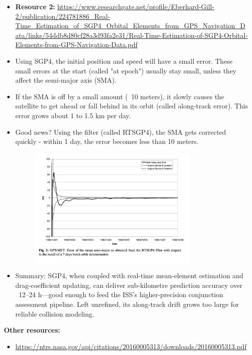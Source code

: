 \documentclass[12pt]{report}
\begin{document}
\begin{itemize}
  \item \textbf{Resource 2:} \url{https://www.researchgate.net/profile/Eberhard-Gill-2/publication/224781886_Real-Time_Estimation_of_SGP4_Orbital_Elements_from_GPS_Navigation_Data/links/54ddb8d80cf28a3d93fa2e31/Real-Time-Estimation-of-SGP4-Orbital-Elements-from-GPS-Navigation-Data.pdf}
        \item Using SGP4, the initial position and speed will have a small error. These small errors at the start (called "at epoch") usually stay small, unless they affect the semi-major axis (SMA).
        \item If the SMA is off by a small amount (~10 meters), it slowly causes the satellite to get ahead or fall behind in its orbit (called along-track error). This error grows about 1 to 1.5 km per day.
        \item Good news? Using the filter (called RTSGP4), the SMA gets corrected quickly - within 1 day, the error becomes less than 10 meters.
        \begin{figure}[H]
          \centering
          \includegraphics[width=0.8\textwidth]{figure_week_4_SGP4-RTSGP4.png}
          \label{fig:SPG4_error_RTSGP4}
        \end{figure}
        \item Summary: SGP4, when coupled with real-time mean-element estimation and drag-coefficient updating, can deliver sub-kilometre prediction accuracy over ~12–24 h—good enough to feed the ISS’s higher-precision conjunction assessment pipeline. Left unrefined, its along-track drift grows too large for reliable collision modeling.
\end{itemize}

\textbf{Other resources:}
\begin{itemize}
  \item \url{https://ntrs.nasa.gov/api/citations/20160005313/downloads/20160005313.pdf}
\end{itemize}
\end{document}
